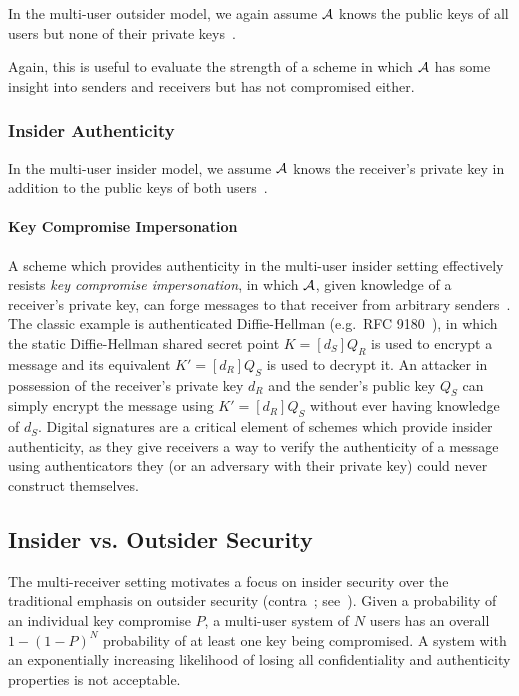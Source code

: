 In the multi-user outsider model, we again assume $\mathcal{A}$ knows the public keys of all users but none of their
private keys~\cite[p. 47]{baek2010}.

Again, this is useful to evaluate the strength of a scheme in which $\mathcal{A}$ has some insight into senders and
receivers but has not compromised either.

\subsubsection{Insider Authenticity}\label{subsubsec:sec-auth-insider}

In the multi-user insider model, we assume $\mathcal{A}$ knows the receiver's private key in addition to the public keys
of both users~\cite[p. 48]{baek2010}.

\paragraph{Key Compromise Impersonation}

A scheme which provides authenticity in the multi-user insider setting effectively resists
\emph{key compromise impersonation}, in which $\mathcal{A}$, given knowledge of a receiver's private key, can
forge messages to that receiver from arbitrary senders~\cite{strangio2006}.
The classic example is authenticated Diffie-Hellman (e.g.\ RFC 9180~\cite{rfc9180, alwen2021}), in which the static
Diffie-Hellman shared secret point $K=[d_S]Q_R$ is used to encrypt a message and its equivalent $K'=[d_R]Q_S$ is used
to decrypt it.
An attacker in possession of the receiver's private key $d_R$ and the sender's public key $Q_S$ can simply encrypt the
message using $K'=[d_R]Q_S$ without ever having knowledge of $d_S$.
Digital signatures are a critical element of schemes which provide insider authenticity, as they give receivers a way to
verify the authenticity of a message using authenticators they (or an adversary with their private key) could never
construct themselves.

\subsection{Insider vs. Outsider Security}\label{subsec:security-insider-vs-outsider}

The multi-receiver setting motivates a focus on insider security over the traditional emphasis on outsider security
(contra~\cite[p. 26]{an2010}\cite[p. 46]{baek2010}; see~\cite{badertscher2018}).
Given a probability of an individual key compromise $P$, a multi-user system of $N$ users has an overall $1-(1-P)^N$
probability of at least one key being compromised.
A system with an exponentially increasing likelihood of losing all confidentiality and authenticity properties is not
acceptable.


